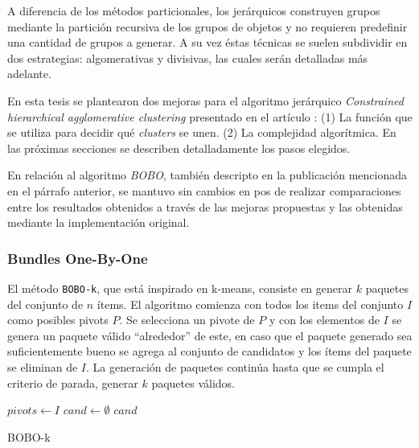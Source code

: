 A diferencia de los métodos particionales, los jerárquicos construyen grupos mediante la partición recursiva de los grupos de objetos y no requieren predefinir una cantidad de grupos a generar. A su vez éstas técnicas se suelen subdividir en dos estrategias: algomerativas y divisivas, las cuales serán detalladas más adelante.

En esta tesis se plantearon dos mejoras para el algoritmo jerárquico \textit{Constrained hierarchical agglomerative clustering} presentado en el artículo \cite{journals/tkde/Amer-YahiaBCFMZ14}: (1) La función que se utiliza para decidir qué \textit{clusters} se unen. (2) La complejidad algorítmica. En las próximas secciones se describen detalladamente los pasos elegidos.

En relación al algoritmo \textit{BOBO}, también descripto en la publicación mencionada en el párrafo anterior, se mantuvo sin cambios en pos de realizar comparaciones entre los resultados obtenidos a través de las mejoras propuestas y las obtenidas mediante la implementación original.

\subsubsection{Bundles One-By-One}
El método \texttt{BOBO-k}, que está inspirado en k-means, consiste en generar $k$ paquetes del conjunto de $n$ ítems. El algoritmo comienza con todos los items del conjunto $I$ como posibles pivots $P$. Se selecciona un pivote de $P$ y con los elementos de $I$ se genera un paquete válido ``alrededor'' de este, en caso que el paquete generado sea suficientemente bueno se agrega al conjunto de candidatos y los ítems del paquete se eliminan de $I$. La generación de paquetes continúa hasta que se cumpla el criterio de parada, generar $k$ paquetes válidos.

\begin{center}
	\begin{algorithm}[H]
	\DontPrintSemicolon
	\SetAlgoLined
		$pivots \leftarrow I$\;
		$cand \leftarrow \emptyset$\;
		\Return $cand$\;
	\caption{BOBO-k}\label{alg:bobo}
	\end{algorithm}
\end{center}

